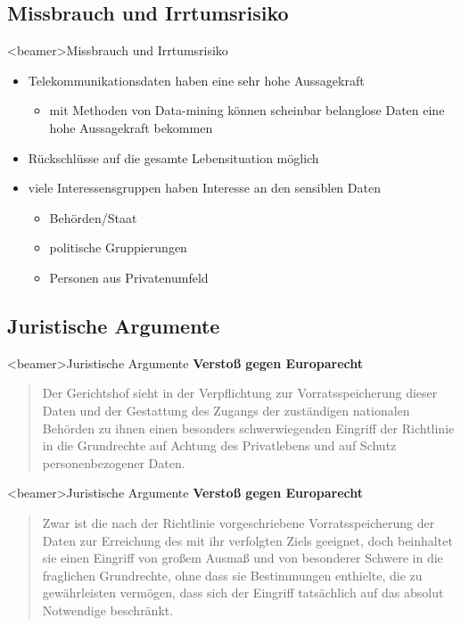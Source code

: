   \subsection*{Missbrauch und Irrtumsrisiko}
    \begin{frame}<beamer>{Missbrauch und Irrtumsrisiko}
      \begin{itemize}
        \item
          Telekommunikationsdaten haben eine sehr hohe Aussagekraft
      \begin{itemize}
         \item mit Methoden von Data-mining können scheinbar belanglose Daten eine hohe Aussagekraft bekommen
      \end{itemize}
        \item
          Rückschlüsse auf die gesamte Lebensituation möglich
 \item viele Interessensgruppen haben Interesse an den sensiblen Daten
          \begin{itemize}
         \item Behörden/Staat
         \item politische Gruppierungen
         \item Personen aus Privatenumfeld
      \end{itemize}
 
      \end{itemize}
    \end{frame}

  \subsection*{Juristische Argumente}
    \begin{frame}<beamer>{Juristische Argumente}
      \textbf{Verstoß gegen Europarecht}
      \begin{quote}
        Der Gerichtshof sieht in der Verpflichtung zur Vorratsspeicherung dieser Daten und der Gestattung des Zugangs der zuständigen nationalen Behörden zu ihnen einen besonders schwerwiegenden Eingriff der Richtlinie in die Grundrechte auf Achtung des Privatlebens und auf Schutz personenbezogener Daten.

      \end{quote}
    \end{frame}

    \begin{frame}<beamer>{Juristische Argumente}
      \textbf{Verstoß gegen Europarecht}
      \begin{quote}
        Zwar ist die nach der Richtlinie vorgeschriebene Vorratsspeicherung der Daten zur Erreichung des mit ihr verfolgten Ziels geeignet, doch beinhaltet sie einen Eingriff von großem Ausmaß und von besonderer Schwere in die fraglichen Grundrechte, ohne dass sie Bestimmungen enthielte, die zu gewährleisten vermögen, dass sich der Eingriff tatsächlich auf das absolut Notwendige beschränkt.

      \end{quote}
    \end{frame}

